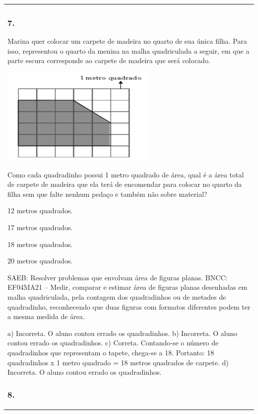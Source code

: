 \begin{mdframed}[linewidth=2pt,linecolor=salmao,roundcorner=2pt]
\begin{escolha}
{{{\begin{longtable}[]{@{}l@{}}
\begin{itemize}
{\subsubsection{7. }

Marina quer colocar um carpete de madeira no quarto de sua única filha.
Para isso, representou o quarto da menina na malha quadriculada a seguir, em que a parte escura corresponde ao carpete de madeira que será
colocado.

\includegraphics[width=2.90385in,height=1.84662in]{media/image160.png}

Como cada quadradinho possui 1 metro quadrado de área, qual é a área total
de carpete de madeira que ela terá de encomendar para colocar no quarto
da filha sem que falte nenhum pedaço e também não sobre material?

\begin{escolha}
\item
  12 metros quadrados.
\item
  17 metros quadrados.
\item
  18 metros quadrados.
\item
  20 metros quadrados.
\end{escolha}

SAEB: Resolver problemas que envolvam área de figuras planas.
BNCC: EF04MA21 -- Medir, comparar e estimar área de figuras planas desenhadas em malha quadriculada,
pela contagem dos quadradinhos ou de metades de quadradinho, reconhecendo que duas figuras
com formatos diferentes podem ter a mesma medida de área.

a) Incorreta. O aluno contou errado os quadradinhos.
b) Incorreta. O aluno contou errado os quadradinhos.
c) Correta. Contando-se o número de quadradinhos que representam o tapete, chega-se a 18. Portanto: 18 quadradinhos x 1 metro quadrado = 18 metros quadrados de carpete.
d) Incorreta. O aluno contou errado os quadradinhos.

\subsubsection{8. }

}
\end{itemize}
\end{longtable}}}}
\end{escolha}
\end{mdframed}
